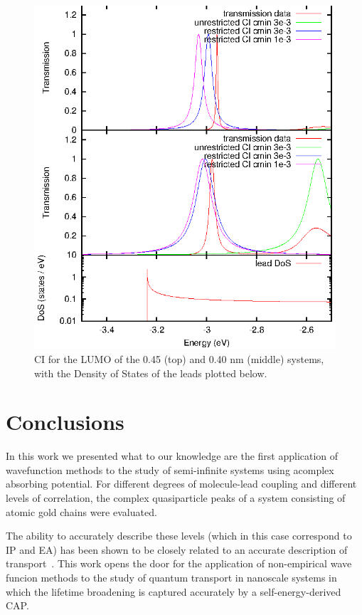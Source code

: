 \begin{figure}
	\begin{center}
		\includegraphics[width=0.9\linewidth]{figures/cilumo.eps}
	\end{center}
	\caption{CI for the \ac{LUMO} of the 0.45 (top) and 0.40 nm (middle)
                 systems, with the Density of States of the leads plotted
                 below.}
	\label{fig:cilumo}
\end{figure}

\section{Conclusions}
\label{sec:conclusions}

In this work we presented what to our knowledge are the first application
of wavefunction methods to the study of semi-infinite systems using acomplex
absorbing potential. For different degrees of molecule-lead coupling and
different levels of correlation, the complex quasiparticle peaks of a system
consisting of atomic gold chains were evaluated.

The ability to accurately describe these levels (which in this case
correspond to \ac{IP} and \ac{EA}) has been shown to be closely related to an
accurate description of transport~\cite{golden}. This work opens the door for
the application of non-empirical wave funcion methods to the study of quantum
transport in nanoscale systems in which the lifetime broadening is captured
accurately by a self-energy-derived \ac{CAP}.
